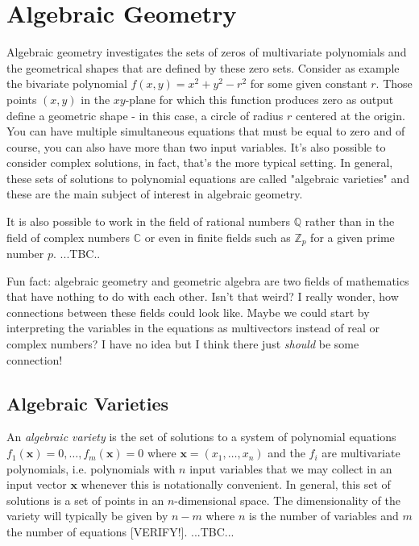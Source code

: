 \section{Algebraic Geometry}
Algebraic geometry investigates the sets of zeros of multivariate polynomials and the geometrical shapes that are defined by these zero sets. Consider as example the bivariate polynomial $f(x,y) = x^2 + y^2 - r^2$ for some given constant $r$. Those points $(x,y)$ in the $xy$-plane for which this function produces zero as output define a geometric shape - in this case, a circle of radius $r$ centered at the origin. You can have multiple simultaneous equations that must be equal to zero and of course, you can also have more than two input variables. It's also possible to consider complex solutions, in fact, that's the more typical setting. In general, these sets of solutions to polynomial equations are called "algebraic varieties" and these are the main subject of interest in algebraic geometry.

\medskip
It is also possible to work in the field of rational numbers $\mathbb{Q}$ rather than in the field of complex numbers $\mathbb{C}$ or even in finite fields such as $\mathbb{Z}_p$ for a given prime number $p$. ...TBC..

\medskip
Fun fact: algebraic geometry and geometric algebra are two fields of mathematics that have nothing to do with each other. Isn't that weird? I really wonder, how connections between these fields could look like. Maybe we could start by interpreting the variables in the equations as multivectors instead of real or complex numbers? I have no idea but I think there just \emph{should} be some connection!




\subsection{Algebraic Varieties}
An \emph{algebraic variety} is the set of solutions to a system of polynomial equations $f_1(\mathbf{x}) = 0, \ldots, f_m(\mathbf{x}) = 0$ where $\mathbf{x} = (x_1, \ldots, x_n)$ and the $f_i$ are multivariate polynomials, i.e. polynomials with $n$ input variables that we may collect in an input vector $\mathbf{x}$ whenever this is notationally convenient. In general, this set of solutions is a set of points in an $n$-dimensional space. The dimensionality of the variety will typically be given by $n-m$ where $n$ is the number of variables and $m$ the number of equations [VERIFY!]. ...TBC...

